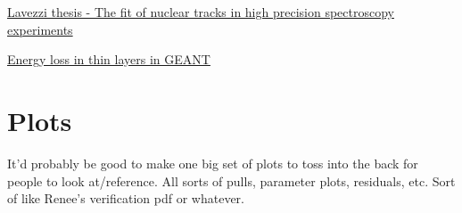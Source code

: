 \documentclass{article}
\begin{document}
	\href{http://bamboo.pv.infn.it/doc/L_Lavezzi.pdf}{Lavezzi thesis - The fit of nuclear tracks in high precision spectroscopy experiments}

  \href{http://www.sciencedirect.com/science/article/pii/0168900295003444}{Energy loss in thin layers in GEANT}


\section{Plots}

It'd probably be good to make one big set of plots to toss into the back for people to look at/reference. All sorts of pulls, parameter plots, residuals, etc. Sort of like Renee's verification pdf or whatever.
\end{document}
